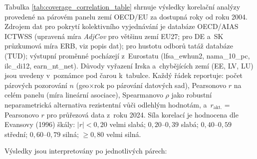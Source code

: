 Tabulka \ref{tab:coverage_correlation_table} shrnuje výsledky korelační analýzy provedené na párovém panelu zemí OECD/\ac{EU} za dostupná roky od roku 2004.
Zdrojem dat pro pokrytí kolektivního vyjednávání je databáze OECD/AIAS ICTWSS (upravená míra \textit{AdjCov} pro většinu zemí EU27; pro DE a~SK průzkumová míra ERB, viz popis dat); pro hustotu odborů tatáž databáze (TUD); výstupní proměnné pocházejí z~Eurostatu (lfsa\_ewhun2, nama\_10\_pc, ilc\_di12, earn\_nt\_net).
Důvody vyřazení Irska a~chybějících zemí (EE, LV, LU) jsou uvedeny v~poznámce pod čarou k~tabulce.
Každý řádek reportuje: počet párových pozorování $n$ (geo$\times$rok po párování datových sad), Pearsonovo $r$ na celém panelu (míra lineární asociace), Spearmanovo $\rho$ jako robustní neparametrická alternativa rezistentní vůči odlehlým hodnotám, a~$r_{\text{akt.}}$ = Pearsonovo $r$ pro průřezová data z~roku 2024.
Síla korelací je hodnocena dle Evansovy (1996) škály: $|r| < 0{,}20$ velmi slabá; $0{,}20$--$0{,}39$ slabá; $0{,}40$--$0{,}59$ střední; $0{,}60$--$0{,}79$ silná; $\geq 0{,}80$ velmi silná.

Výsledky jsou interpretovány po jednotlivých párech:

